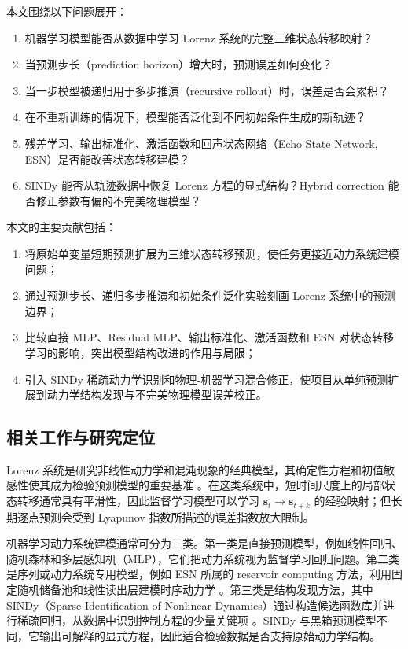 \documentclass[UTF8,a4paper,12pt]{ctexart}
\begin{document}
本文围绕以下问题展开：

\begin{enumerate}
    \item 机器学习模型能否从数据中学习 Lorenz 系统的完整三维状态转移映射？
    \item 当预测步长（prediction horizon）增大时，预测误差如何变化？
    \item 当一步模型被递归用于多步推演（recursive rollout）时，误差是否会累积？
    \item 在不重新训练的情况下，模型能否泛化到不同初始条件生成的新轨迹？
    \item 残差学习、输出标准化、激活函数和回声状态网络（Echo State Network, ESN）是否能改善状态转移建模？
    \item SINDy 能否从轨迹数据中恢复 Lorenz 方程的显式结构？Hybrid correction 能否修正参数有偏的不完美物理模型？
\end{enumerate}

本文的主要贡献包括：

\begin{enumerate}
    \item 将原始单变量短期预测扩展为三维状态转移预测，使任务更接近动力系统建模问题；
    \item 通过预测步长、递归多步推演和初始条件泛化实验刻画 Lorenz 系统中的预测边界；
    \item 比较直接 MLP、Residual MLP、输出标准化、激活函数和 ESN 对状态转移学习的影响，突出模型结构改进的作用与局限；
    \item 引入 SINDy 稀疏动力学识别和物理-机器学习混合修正，使项目从单纯预测扩展到动力学结构发现与不完美物理模型误差校正。
\end{enumerate}

\subsection{相关工作与研究定位}

Lorenz 系统是研究非线性动力学和混沌现象的经典模型，其确定性方程和初值敏感性使其成为检验预测模型的重要基准 \cite{lorenz1963,strogatz2015}。在这类系统中，短时间尺度上的局部状态转移通常具有平滑性，因此监督学习模型可以学习 $\mathbf{s}_t\to\mathbf{s}_{t+k}$ 的经验映射；但长期逐点预测会受到 Lyapunov 指数所描述的误差指数放大限制。

机器学习动力系统建模通常可分为三类。第一类是直接预测模型，例如线性回归、随机森林和多层感知机（MLP），它们把动力系统视为监督学习回归问题。第二类是序列或动力系统专用模型，例如 ESN 所属的 reservoir computing 方法，利用固定随机储备池和线性读出层建模时序动力学 \cite{lukosevicius2009}。第三类是结构发现方法，其中 SINDy（Sparse Identification of Nonlinear Dynamics）通过构造候选函数库并进行稀疏回归，从数据中识别控制方程的少量关键项 \cite{brunton2016}。SINDy 与黑箱预测模型不同，它输出可解释的显式方程，因此适合检验数据是否支持原始动力学结构。
\end{document}
